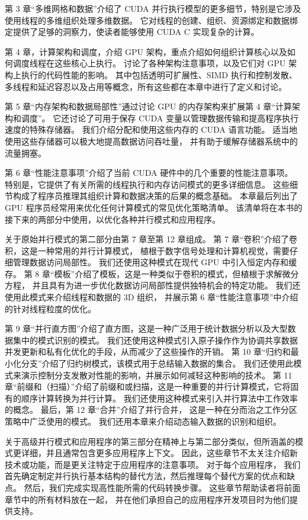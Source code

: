 第 3 章“多维网格和数据”介绍了 CUDA 并行执行模型的更多细节，特别是它涉及使用线程的多维组织处理多维数据。 
它对线程的创建、组织、资源绑定和数据绑定提供了足够的洞察力，使读者能够使用 CUDA C 实现复杂的计算。

第 4 章，计算架构和调度，介绍 GPU 架构，重点介绍如何组织计算核心以及如何调度线程在这些核心上执行。 
讨论了各种架构注意事项，以及它们对 GPU 架构上执行的代码性能的影响。 其中包括透明可扩展性、SIMD 执行和控制发散、
多线程和延迟容忍以及占用等概念，所有这些都在本章中进行了定义和讨论。

第 5 章“内存架构和数据局部性”通过讨论 GPU 的内存架构来扩展第 4 章“计算架构和调度”。 
它还讨论了可用于保存 CUDA 变量以管理数据传输和提高程序执行速度的特殊存储器。 
我们介绍分配和使用这些内存的 CUDA 语言功能。 适当地使用这些存储器可以极大地提高数据访问吞吐量，
并有助于缓解存储器系统中的流量拥塞。

第 6 章“性能注意事项”介绍了当前 CUDA 硬件中的几个重要的性能注意事项。 
特别是，它提供了有关所需的线程执行和内存访问模式的更多详细信息。 
这些细节构成了程序员推理其组织计算和数据决策的后果的概念基础。 
本章最后列出了 GPU 程序员经常用来优化任何计算模式的常见优化策略清单。 
该清单将在本书的接下来的两部分中使用，以优化各种并行模式和应用程序。

关于原始并行模式的第二部分由第 7 章至第 12 章组成。 第 7 章“卷积”介绍了卷积，这是一种常用的并行计算模式，
植根于数字信号处理和计算机视觉，需要仔细管理数据访问局部性。 我们还使用这种模式在现代 GPU 中引入恒定内存和缓存。 
第 8 章“模板”介绍了模板，这是一种类似于卷积的模式，但植根于求解微分方程，
并且具有为进一步优化数据访问局部性提供独特机会的特定功能。 我们还使用此模式来介绍线程和数据的 3D 组织，
并展示第 6 章“性能注意事项”中介绍的针对线程粒度的优化。

第 9 章“并行直方图”介绍了直方图，这是一种广泛用于统计数据分析以及大型数据集中的模式识别的模式。 
我们还使用这种模式引入原子操作作为协调共享数据并发更新和私有化优化的手段，从而减少了这些操作的开销。 
第 10 章“归约和最小化分支”介绍了归约树模式，该模式用于总结输入数据的集合。 
我们还使用此模式来演示控制分支发散对性能的影响，并展示如何减轻这种影响的技术。 
第 11 章“前缀和（扫描）”介绍了前缀和或扫描，这是一种重要的并行计算模式，它将固有的顺序计算转换为并行计算。 
我们还使用这种模式来引入并行算法中工作效率的概念。 最后，第 12 章“合并”介绍了并行合并，
这是一种在分而治之工作分区策略中广泛使用的模式。 我们还用本章来介绍动态输入数据的识别和组织。

关于高级并行模式和应用程序的第三部分在精神上与第二部分类似，但所涵盖的模式更详细，并且通常包含更多应用程序上下文。 
因此，这些章节不太关注介绍新技术或功能，而是更关注特定于应用程序的注意事项。 对于每个应用程序，
我们首先确定制定并行执行基本结构的替代方法，然后推理每个替代方案的优点和缺点。 
然后，我们完成实现高性能所需的代码转换步骤。 这些章节帮助读者将前面章节中的所有材料放在一起，
并在他们承担自己的应用程序开发项目时为他们提供支持。

